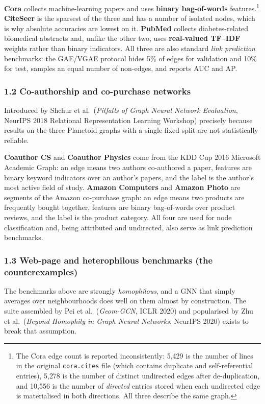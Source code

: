 \textbf{Cora} collects machine-learning papers and uses \textbf{binary bag-of-words}
features.\footnote{The Cora edge count is reported inconsistently: 5{,}429 is the number of
lines in the original \texttt{cora.cites} file (which contains duplicate and
self-referential entries), 5{,}278 is the number of distinct undirected edges after
de-duplication, and 10{,}556 is the number of \emph{directed} entries stored when each
undirected edge is materialised in both directions. All three describe the same graph.}
\textbf{CiteSeer} is the sparsest of the three and has a number of isolated nodes, which is
why absolute accuracies are lowest on it. \textbf{PubMed} collects diabetes-related
biomedical abstracts and, unlike the other two, uses \textbf{real-valued TF--IDF} weights
rather than binary indicators. All three are also standard \emph{link prediction}
benchmarks: the GAE/VGAE protocol hides 5\% of edges for validation and 10\% for test,
samples an equal number of non-edges, and reports AUC and AP.

\subsubsection*{1.2 Co-authorship and co-purchase networks}

Introduced by Shchur et al.\ (\emph{Pitfalls of Graph Neural Network Evaluation}, NeurIPS
2018 Relational Representation Learning Workshop) precisely because results on the three
Planetoid graphs with a single fixed split are not statistically reliable.

\textbf{Coauthor CS} and \textbf{Coauthor Physics} come from the KDD Cup 2016 Microsoft
Academic Graph: an edge means two authors co-authored a paper, features are binary keyword
indicators over an author's papers, and the label is the author's most active field of
study. \textbf{Amazon Computers} and \textbf{Amazon Photo} are segments of the Amazon
co-purchase graph: an edge means two products are frequently bought together, features are
binary bag-of-words over product reviews, and the label is the product category. All four
are used for node classification and, being attributed and undirected, also serve as link
prediction benchmarks.

\subsubsection*{1.3 Web-page and heterophilous benchmarks (the counterexamples)}

The benchmarks above are strongly \emph{homophilous}, and a GNN that simply averages over
neighbourhoods does well on them almost by construction. The suite assembled by Pei et al.\
(\emph{Geom-GCN}, ICLR 2020) and popularised by Zhu et al.\ (\emph{Beyond Homophily in
Graph Neural Networks}, NeurIPS 2020) exists to break that assumption.

